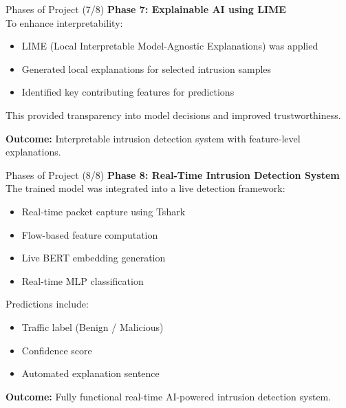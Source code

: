 \documentclass[aspectratio=169,xcolor=dvipsnames]{beamer}
\begin{document}
\begin{frame}{Phases of Project (7/8)}
\textbf{Phase 7: Explainable AI using LIME} \\[6pt]

To enhance interpretability:

\begin{itemize}
    \item LIME (Local Interpretable Model-Agnostic Explanations) was applied
    \item Generated local explanations for selected intrusion samples
    \item Identified key contributing features for predictions
\end{itemize}

This provided transparency into model decisions and improved trustworthiness.

\vspace{0.2cm}
\textbf{Outcome:}
Interpretable intrusion detection system with feature-level explanations.
\end{frame}


\begin{frame}{Phases of Project (8/8)}
\textbf{Phase 8: Real-Time Intrusion Detection System} \\[6pt]

The trained model was integrated into a live detection framework:

\begin{itemize}
    \item Real-time packet capture using Tshark
    \item Flow-based feature computation
    \item Live BERT embedding generation
    \item Real-time MLP classification
\end{itemize}

Predictions include:

\begin{itemize}
    \item Traffic label (Benign / Malicious)
    \item Confidence score
    \item Automated explanation sentence
\end{itemize}

\vspace{0.2cm}
\textbf{Outcome:}
Fully functional real-time AI-powered intrusion detection system.
\end{frame}
\end{document}

